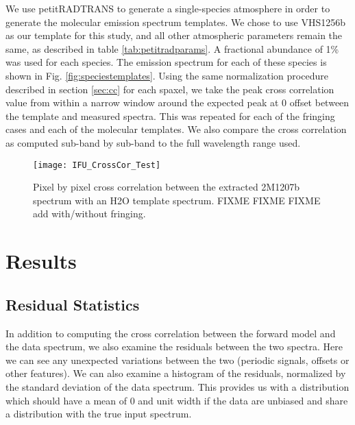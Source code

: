 We use petitRADTRANS to generate a single-species atmosphere in order to generate the molecular emission spectrum templates. 
We chose to use VHS1256b as our template for this study, and all other atmospheric parameters remain the same, as described in table \ref{tab:petitradparams}. 
A fractional abundance of 1\% was used for each species.
The emission spectrum for each of these species is shown in Fig. \ref{fig:speciestemplates}.
Using the same normalization procedure described in section \ref{sec:cc} for each spaxel, we take the peak cross correlation value from within a narrow window around the expected peak at 0 offset between the template and measured spectra. 
This was repeated for each of the fringing cases and each of the molecular templates. 
We also compare the cross correlation as computed sub-band by sub-band to the full wavelength range used.
\begin{figure}[t]
	\centering
	\texttt{[image: IFU\_CrossCor\_Test]}
	\caption{Pixel by pixel cross correlation between the extracted 2M1207b spectrum with an H2O template spectrum. FIXME FIXME FIXME add with/without fringing.}
	\label{fig:h2omap}
\end{figure}
\clearpage
\section{Results}

\subsection{Residual Statistics}
In addition to computing the cross correlation between the forward model and the data spectrum, we also examine the residuals between the two spectra.
Here we can see any unexpected variations between the two (periodic signals, offsets or other features).
We can also examine a histogram of the residuals, normalized by the standard deviation of the data spectrum.
This provides us with a  distribution which should have a mean of 0 and unit width if the data are unbiased and share a distribution with the true input spectrum.

